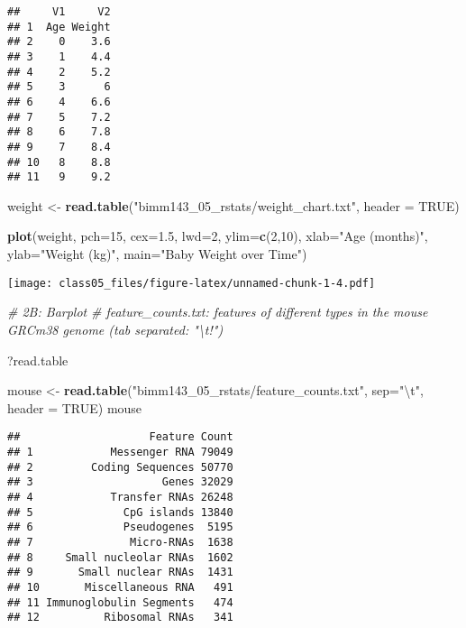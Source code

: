 \documentclass[]{article}
\newenvironment{Shaded}{\begin{snugshade}}{\end{snugshade}}
\newcommand{\KeywordTok}[1]{\textcolor[rgb]{0.13,0.29,0.53}{\textbf{#1}}}
\newcommand{\DataTypeTok}[1]{\textcolor[rgb]{0.13,0.29,0.53}{#1}}
\newcommand{\DecValTok}[1]{\textcolor[rgb]{0.00,0.00,0.81}{#1}}
\newcommand{\FloatTok}[1]{\textcolor[rgb]{0.00,0.00,0.81}{#1}}
\newcommand{\CharTok}[1]{\textcolor[rgb]{0.31,0.60,0.02}{#1}}
\newcommand{\StringTok}[1]{\textcolor[rgb]{0.31,0.60,0.02}{#1}}
\newcommand{\CommentTok}[1]{\textcolor[rgb]{0.56,0.35,0.01}{\textit{#1}}}
\newcommand{\OtherTok}[1]{\textcolor[rgb]{0.56,0.35,0.01}{#1}}
\newcommand{\NormalTok}[1]{#1}
\begin{document}
\begin{verbatim}
##     V1     V2
## 1  Age Weight
## 2    0    3.6
## 3    1    4.4
## 4    2    5.2
## 5    3      6
## 6    4    6.6
## 7    5    7.2
## 8    6    7.8
## 9    7    8.4
## 10   8    8.8
## 11   9    9.2
\end{verbatim}

\begin{Shaded}
\begin{Highlighting}[]
\NormalTok{weight <-}\StringTok{ }\KeywordTok{read.table}\NormalTok{(}\StringTok{"bimm143_05_rstats/weight_chart.txt"}\NormalTok{, }\DataTypeTok{header =} \OtherTok{TRUE}\NormalTok{)}

\KeywordTok{plot}\NormalTok{(weight, }\DataTypeTok{pch=}\DecValTok{15}\NormalTok{, }\DataTypeTok{cex=}\FloatTok{1.5}\NormalTok{, }\DataTypeTok{lwd=}\DecValTok{2}\NormalTok{, }\DataTypeTok{ylim=}\KeywordTok{c}\NormalTok{(}\DecValTok{2}\NormalTok{,}\DecValTok{10}\NormalTok{), }\DataTypeTok{xlab=}\StringTok{"Age (months)"}\NormalTok{, }\DataTypeTok{ylab=}\StringTok{"Weight (kg)"}\NormalTok{, }\DataTypeTok{main=}\StringTok{"Baby Weight over Time"}\NormalTok{)}
\end{Highlighting}
\end{Shaded}

\texttt{[image: class05\_files/figure-latex/unnamed-chunk-1-4.pdf]}

\begin{Shaded}
\begin{Highlighting}[]
\CommentTok{# 2B: Barplot}
\CommentTok{# feature_counts.txt: features of different types in the mouse GRCm38 genome (tab separated: "\textbackslash{}t!")}

\NormalTok{?read.table}

\NormalTok{mouse <-}\StringTok{ }\KeywordTok{read.table}\NormalTok{(}\StringTok{"bimm143_05_rstats/feature_counts.txt"}\NormalTok{, }\DataTypeTok{sep=}\StringTok{"}\CharTok{\textbackslash{}t}\StringTok{"}\NormalTok{, }\DataTypeTok{header =} \OtherTok{TRUE}\NormalTok{)}
\NormalTok{mouse}
\end{Highlighting}
\end{Shaded}

\begin{verbatim}
##                    Feature Count
## 1            Messenger RNA 79049
## 2         Coding Sequences 50770
## 3                    Genes 32029
## 4            Transfer RNAs 26248
## 5              CpG islands 13840
## 6              Pseudogenes  5195
## 7               Micro-RNAs  1638
## 8     Small nucleolar RNAs  1602
## 9       Small nuclear RNAs  1431
## 10       Miscellaneous RNA   491
## 11 Immunoglobulin Segments   474
## 12          Ribosomal RNAs   341
\end{verbatim}
\end{document}
